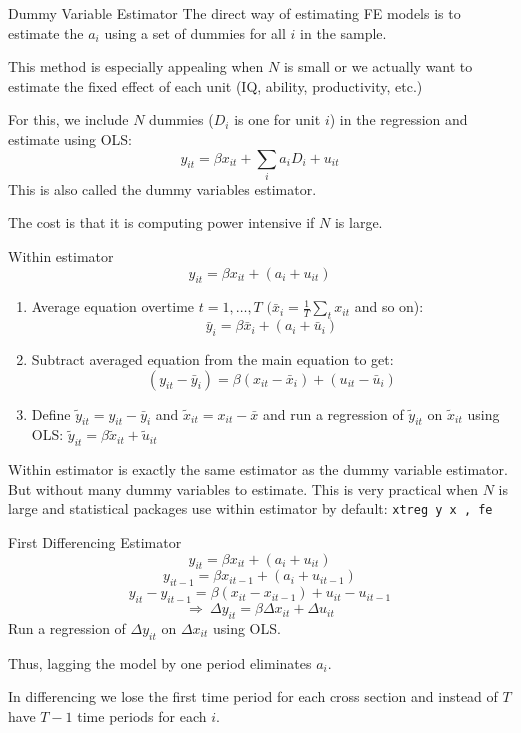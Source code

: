 \documentclass{beamer}
\begin{document}
\begin{frame}{Dummy Variable Estimator}
The direct way of estimating FE models is to estimate the $a_i$ using a set of dummies for all $i$ in the sample.\bigskip

This method is especially appealing when $N$ is small or we actually want to estimate the fixed effect of each unit (IQ, ability, productivity, etc.)\medskip

For this, we include $N$ dummies ($D_i$ is one for unit $i$) in the regression and estimate using OLS:
\[y_{it} = \beta x_{it} + \sum_i a_i D_i + u_{it}\]
This is also called the dummy variables estimator.\medskip

The cost is that it is computing power intensive if $N$ is large.

\end{frame}

\begin{frame}{Within estimator}
\[y_{it} = \beta x_{it}+(a_i+u_{it})\]\vspace*{-10pt}
\begin{enumerate}
\item Average equation overtime $t = 1,\dots,T$ $ (\bar{x}_i=\frac{1}{T}\sum_t x_{it}$ and so on):
\[\bar{y}_{i} = \beta \bar{x}_{i}+(a_i+\bar{u}_{i})\]
\item Subtract averaged equation from the main equation to get:
\[(y_{it}-\bar{y}_{i}) =  \beta (x_{it}-\bar{x}_{i})+(u_{it}-\bar{u}_{i})\]	
\item Define $\tilde{y}_{it}=y_{it}-\bar{y}_i$ and $\tilde{x}_{it}=x_{it}-\bar{x}$ and run a regression of $\tilde{y}_{it}$ on $\tilde{x}_{it}$ using OLS: $\tilde{y}_{it}=\beta\tilde{x}_{it}+\tilde{u}_{it}$
\end{enumerate}\medskip
Within estimator is exactly the same estimator as the dummy variable estimator. But without many dummy variables to estimate.
This is very practical when $N$ is large and statistical packages use within estimator by default: 
\texttt{xtreg y x , fe}

\end{frame}


\begin{frame}{First Differencing Estimator}
\[y_{it} =  \beta x_{it}+(a_i+u_{it})\]
\[y_{it-1} =  \beta x_{it-1}+(a_i+u_{it-1})\]
\[y_{it}-y_{it-1} = \beta (x_{it}-x_{it-1})+u_{it}-u_{it-1} \]\[ \Rightarrow \ \Delta y_{it}=\beta \Delta x_{it}+\Delta u_{it} \]
Run a regression of $\Delta y_{it}$ on $\Delta x_{it}$ using OLS.\bigskip

Thus, lagging the model by one period eliminates $a_i$.\bigskip


In differencing we lose the first time period for each cross section and instead of $T$ have $T-1$ time periods for each $i$.
\end{frame}
\end{document}
